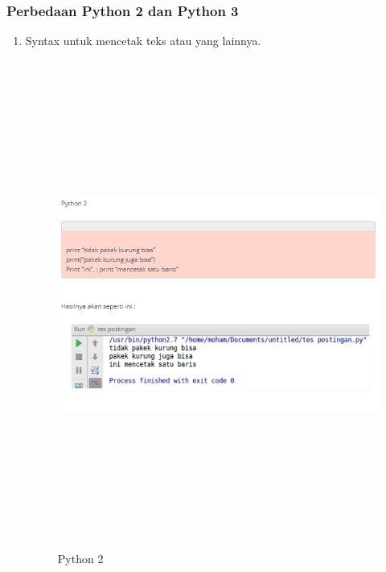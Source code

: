 \subsubsection{Perbedaan Python 2 dan Python 3}
\par
\begin{enumerate}
\item 
Syntax untuk mencetak teks atau yang lainnya.
\begin{figure}[!htbp]
\centering
\includegraphics[width=15cm,height=16cm]{figures/1.PNG}
\caption{Python 2}
\label{penanda}
\end{figure}


\end{enumerate}
